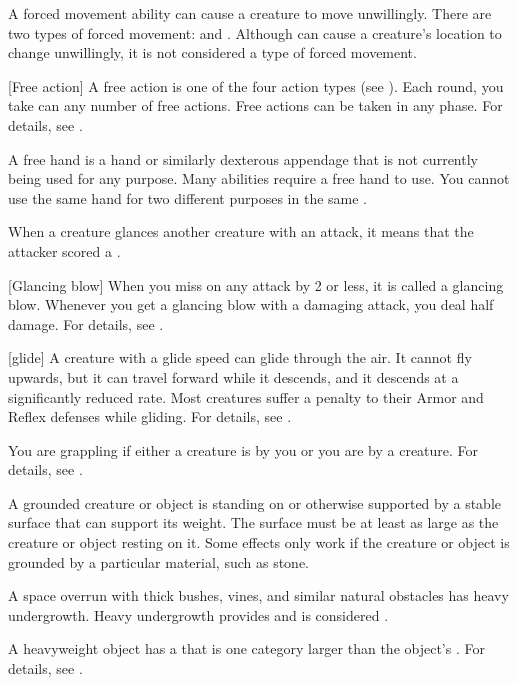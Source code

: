  A forced movement ability can cause a creature to move unwillingly.
There are two types of forced movement:  and .
Although  can cause a creature's location to change unwillingly, it is not considered a type of forced movement.

[Free action] A free action is one of the four action types (see ).
Each round, you take can any number of free actions.
Free actions can be taken in any phase.
For details, see .

 A free hand is a hand or similarly dexterous appendage that is not currently being used for any purpose.
Many abilities require a free hand to use.
You cannot use the same hand for two different purposes in the same .

 When a creature glances another creature with an attack, it means that the attacker scored a .

[Glancing blow] When you miss on any attack by 2 or less, it is called a glancing blow.
Whenever you get a glancing blow with a damaging attack, you deal half damage.
For details, see .

[glide] A creature with a glide speed can glide through the air.
It cannot fly upwards, but it can travel forward while it descends, and it descends at a significantly reduced rate.
Most creatures suffer a  penalty to their Armor and Reflex defenses while gliding.
For details, see .

 You are grappling if either a creature is \grappled by you or you are \grappled by a creature.
For details, see .

 A grounded creature or object is standing on or otherwise supported by a stable surface that can support its weight.
The surface must be at least as large as the creature or object resting on it.
Some effects only work if the creature or object is grounded by a particular material, such as stone.

 A space overrun with thick bushes, vines, and similar natural obstacles has heavy undergrowth.
Heavy undergrowth provides  and is considered .

 A heavyweight object has a  that is one category larger than the object's .
For details, see .

